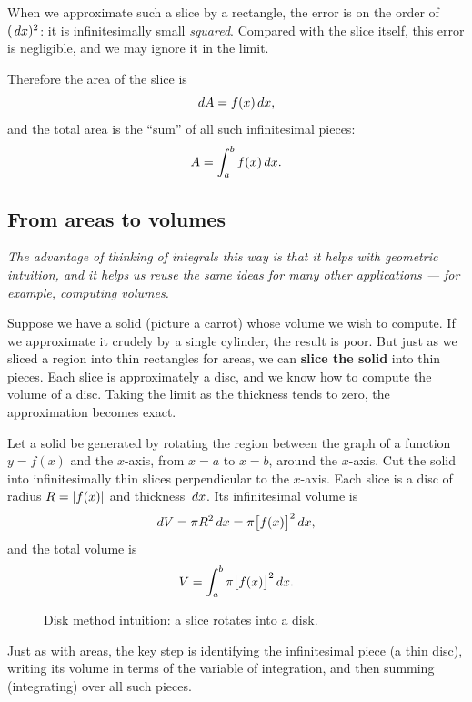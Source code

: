 \begin{remark}
When we approximate such a slice by a rectangle, the error is on the order of $(\,dx)^{2}$: it is infinitesimally small \textit{squared}.  Compared with the slice itself, this error is negligible, and we may ignore it in the limit.
\end{remark}

Therefore the area of the slice is
\[
  dA = f(x)\,dx,
\]
and the total area is the ``sum'' of all such infinitesimal pieces:
\[
  A = \int_{a}^{b} f(x)\,dx.
\]

\subsection*{From areas to volumes}

\textit{The advantage of thinking of integrals this way is that it helps with geometric intuition, and it helps us reuse the same ideas for many other applications --- for example, computing volumes.}

Suppose we have a solid (picture a carrot) whose volume we wish to compute.  If we approximate it crudely by a single cylinder, the result is poor.  But just as we sliced a region into thin rectangles for areas, we can \textbf{slice the solid} into thin pieces.  Each slice is approximately a disc, and we know how to compute the volume of a disc.  Taking the limit as the thickness tends to zero, the approximation becomes exact.

\begin{definition}
\label{def:10-1}
Let a solid be generated by rotating the region between the graph of a function $y = f(x)$ and the $x$-axis, from $x = a$ to $x = b$, around the $x$-axis.  Cut the solid into infinitesimally thin slices perpendicular to the $x$-axis.  Each slice is a disc of radius $R = \left\lvert f(x) \right\rvert$ and thickness $\,dx$.  Its infinitesimal volume is
\[
  dV = \pi R^{2}\,dx = \pi\bigl[f(x)\bigr]^{2}\,dx,
\]
and the total volume is
\[
  V = \int_{a}^{b} \pi\bigl[f(x)\bigr]^{2}\,dx.
\]
\end{definition}

\begin{figure}[ht]
  \centering
  
  \caption{Disk method intuition: a slice rotates into a disk.}
  \label{fig:disk-method-slice}
\end{figure}

\begin{remark}
Just as with areas, the key step is identifying the infinitesimal piece (a thin disc), writing its volume in terms of the variable of integration, and then summing (integrating) over all such pieces.
\end{remark}

